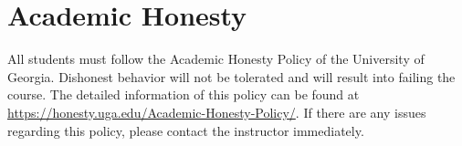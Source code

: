 \documentclass[11pt,letterpaper]{article}
\begin{document}
\section{Academic Honesty}

All students must follow the Academic Honesty Policy of the University of Georgia. Dishonest behavior will not be tolerated and will result into failing the course. The detailed information of this policy can be found at \url{https://honesty.uga.edu/Academic-Honesty-Policy/}. If there are any issues regarding this policy, please contact the instructor immediately.
\end{document}
